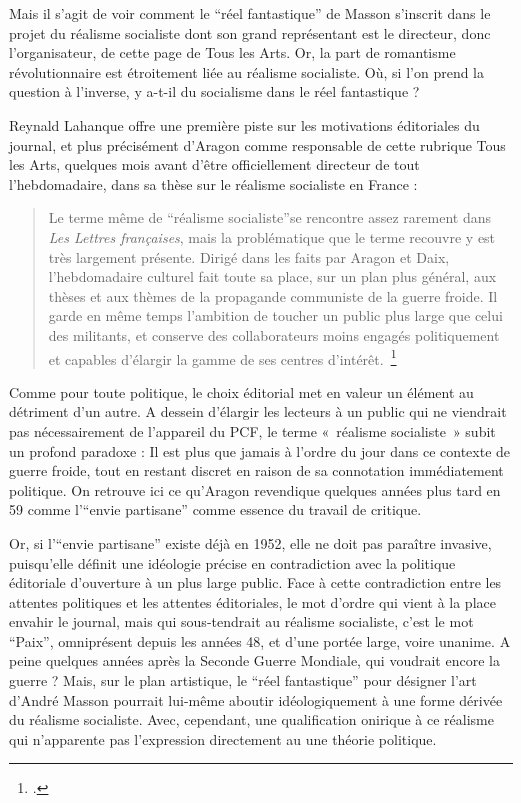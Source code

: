 	Mais il s’agit de voir comment le \enquote{réel fantastique} de Masson s’inscrit dans le projet du réalisme socialiste dont son grand représentant est le directeur, donc l’organisateur, de cette page de Tous les Arts. Or, la part de romantisme révolutionnaire est étroitement liée au réalisme socialiste. Où, si l’on prend la question à l’inverse, y a-t-il du socialisme dans le réel fantastique ? 

	Reynald Lahanque offre une première piste sur les motivations éditoriales du journal, et plus précisément d’Aragon comme responsable de cette rubrique Tous les Arts, quelques mois avant d’être officiellement directeur de tout l’hebdomadaire, dans sa thèse sur le réalisme socialiste en France : 

\begin{quote}
Le terme même de \enquote{réalisme socialiste}se rencontre assez rarement dans \emph{Les Lettres françaises}, mais la problématique que le terme recouvre y est très largement présente. Dirigé dans les faits par Aragon et Daix, l'hebdomadaire culturel fait toute sa place, sur un plan plus général, aux thèses et aux thèmes de la propagande communiste de la guerre froide. Il garde en même temps l'ambition de toucher un public plus large que celui des militants, et conserve des collaborateurs moins engagés politiquement et capables d'élargir la gamme de ses centres d’intérêt. \footcite{}\end{quote}

	Comme pour toute politique, le choix éditorial met en valeur un élément au détriment d’un autre. A dessein d’élargir les lecteurs à un public qui ne viendrait pas nécessairement de l’appareil du PCF, le terme « réalisme socialiste » subit un profond paradoxe : Il est plus que jamais à l’ordre du jour dans ce contexte de guerre froide, tout en restant discret en raison de sa connotation immédiatement politique. On retrouve ici ce qu’Aragon revendique quelques années plus tard en 59 comme l’\enquote{envie partisane} comme essence du travail de critique. 

Or, si l’\enquote{envie partisane} existe déjà en 1952, elle ne doit pas paraître invasive, puisqu’elle définit une idéologie précise en contradiction avec la politique éditoriale d’ouverture à un plus large public. Face à cette contradiction entre les attentes politiques et les attentes éditoriales, le mot d’ordre qui vient à la place envahir le journal, mais qui sous-tendrait au réalisme socialiste, c’est le mot \enquote{Paix}, omniprésent depuis les années 48, et d’une portée large, voire unanime. A peine quelques années après la Seconde Guerre Mondiale, qui voudrait encore la guerre ? Mais, sur le plan artistique, le \enquote{réel fantastique} pour désigner l’art d’André Masson pourrait lui-même aboutir idéologiquement à une forme dérivée du réalisme socialiste. Avec, cependant, une qualification onirique à ce réalisme qui n’apparente pas l’expression directement au une théorie politique. 

